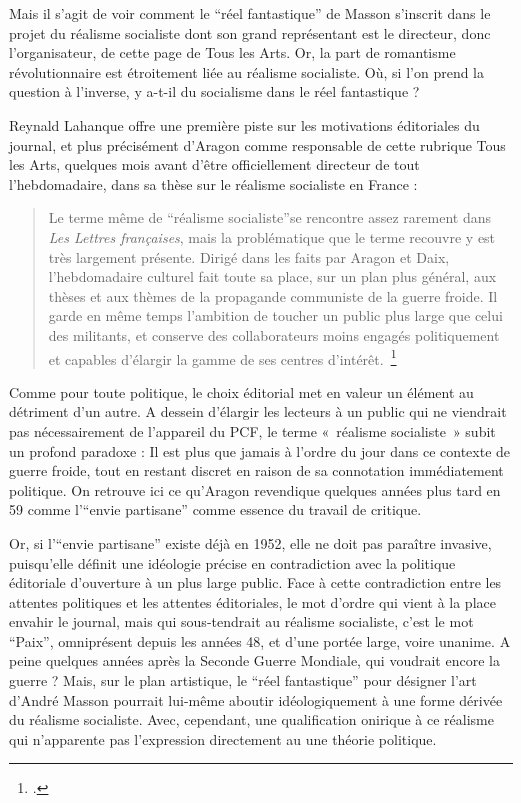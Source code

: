 	Mais il s’agit de voir comment le \enquote{réel fantastique} de Masson s’inscrit dans le projet du réalisme socialiste dont son grand représentant est le directeur, donc l’organisateur, de cette page de Tous les Arts. Or, la part de romantisme révolutionnaire est étroitement liée au réalisme socialiste. Où, si l’on prend la question à l’inverse, y a-t-il du socialisme dans le réel fantastique ? 

	Reynald Lahanque offre une première piste sur les motivations éditoriales du journal, et plus précisément d’Aragon comme responsable de cette rubrique Tous les Arts, quelques mois avant d’être officiellement directeur de tout l’hebdomadaire, dans sa thèse sur le réalisme socialiste en France : 

\begin{quote}
Le terme même de \enquote{réalisme socialiste}se rencontre assez rarement dans \emph{Les Lettres françaises}, mais la problématique que le terme recouvre y est très largement présente. Dirigé dans les faits par Aragon et Daix, l'hebdomadaire culturel fait toute sa place, sur un plan plus général, aux thèses et aux thèmes de la propagande communiste de la guerre froide. Il garde en même temps l'ambition de toucher un public plus large que celui des militants, et conserve des collaborateurs moins engagés politiquement et capables d'élargir la gamme de ses centres d’intérêt. \footcite{}\end{quote}

	Comme pour toute politique, le choix éditorial met en valeur un élément au détriment d’un autre. A dessein d’élargir les lecteurs à un public qui ne viendrait pas nécessairement de l’appareil du PCF, le terme « réalisme socialiste » subit un profond paradoxe : Il est plus que jamais à l’ordre du jour dans ce contexte de guerre froide, tout en restant discret en raison de sa connotation immédiatement politique. On retrouve ici ce qu’Aragon revendique quelques années plus tard en 59 comme l’\enquote{envie partisane} comme essence du travail de critique. 

Or, si l’\enquote{envie partisane} existe déjà en 1952, elle ne doit pas paraître invasive, puisqu’elle définit une idéologie précise en contradiction avec la politique éditoriale d’ouverture à un plus large public. Face à cette contradiction entre les attentes politiques et les attentes éditoriales, le mot d’ordre qui vient à la place envahir le journal, mais qui sous-tendrait au réalisme socialiste, c’est le mot \enquote{Paix}, omniprésent depuis les années 48, et d’une portée large, voire unanime. A peine quelques années après la Seconde Guerre Mondiale, qui voudrait encore la guerre ? Mais, sur le plan artistique, le \enquote{réel fantastique} pour désigner l’art d’André Masson pourrait lui-même aboutir idéologiquement à une forme dérivée du réalisme socialiste. Avec, cependant, une qualification onirique à ce réalisme qui n’apparente pas l’expression directement au une théorie politique. 

